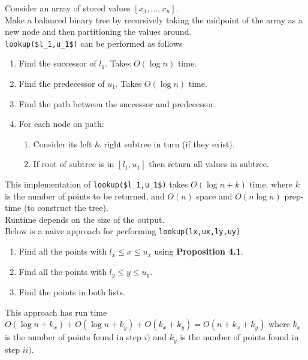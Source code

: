\documentclass[11pt,a4paper]{article}
\begin{document}
Consider an array of stored values $[x_1,\dots,x_n]$.\\
Make a balanced binary tree by recursively taking the midpoint of the array as a new node and then partitioning the values around.\\
\lstinline!lookup($l_1,u_1$)! can be performed as follows
\begin{enumerate}
	\item Find the successor of $l_1$. Takes $O(\log n)$ time.
	\item Find the predecessor of $u_1$. Takes $O(\log n)$ time.
	\item Find the path between the successor and predecessor.
	\item For each node on path:
	\begin{enumerate}
		\item Consider its left \& right subtree in turn (if they exist).
		\item If root of subtree is in $[l_1,u_1]$ then return all values in subtree.
	\end{enumerate}
\end{enumerate}
This implementation of \lstinline!lookup($l_1,u_1$)! takes $O(\log n+k)$ time, where $k$ is the number of points to be returned, and $O(n)$ space and $O(n\log n)$ prep-time (to construct the tree).\\
\nb Runtime depends on the size of the output.\\

Below is a na\"ive approach for performing \lstinline!lookup(lx,ux,ly,uy)!
\begin{enumerate}
	\item Find all the points with $l_x\leq x\leq u_x$ using \textbf{Proposition 4.1}.
	\item Find all the points with $l_y\leq y\leq u_y$.
	\item Find the points in both lists.
\end{enumerate}
This approach has run time $O(\log n+k_x)+O(\log n+k_y)+O(k_x+k_y)=O(n+k_x+k_y)$ where $k_x$ is the number of points found in step $i)$ and $k_y$ is the number of points found in step $ii)$.\\
\end{document}
